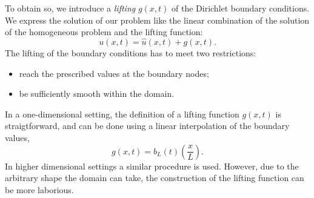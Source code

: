 \documentclass[../../thesis.tex]{subfiles}
\begin{document}
To obtain so, we introduce a \emph{lifting} $g(x,t)$ of the Dirichlet boundary conditions.
We express the solution of our problem like the linear combination of 
the solution of the homogeneous problem and the lifting function:
\begin{equation}
    \label{eq:1d_fom_homogeneous_plus_lifting}
    u(x,t) = \hat{u}(x,t) + g(x,t).
\end{equation}
The lifting of the boundary conditions has to meet two restrictions:
\begin{itemize}
    \item reach the prescribed values at the boundary nodes;
    \item be sufficiently smooth within the domain.
\end{itemize}
In a one-dimensional setting, the definition of a lifting function $g(x,t)$ is straigtforward, 
and can be done using a linear interpolation of the boundary values,
\begin{equation}
    \label{eq:1d_fom_dirichlet_lifting}
    g(x,t) = b_L(t) \left(\frac{x}{L}\right).
\end{equation}
In higher dimensional settings a similar procedure is used. 
However, due to the arbitrary shape the domain can take, 
the construction of the lifting function can be more laborious.
\end{document}
